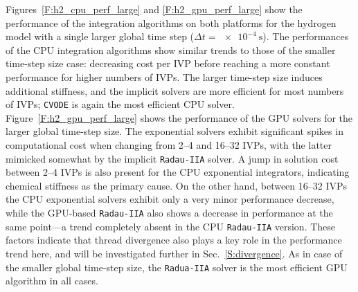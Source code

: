 \documentclass[preprint,review,11pt]{elsarticle}
\begin{document}
Figures~\ref{F:h2_cpu_perf_large} and \ref{F:h2_gpu_perf_large} show the performance of the integration algorithms on both platforms for the hydrogen model with a single larger global time step ($\Delta t=\SI{e-4}{\second}$).
The performances of the CPU integration algorithms show similar trends to those of the smaller time-step size case: decreasing cost per IVP before reaching a more constant performance for higher numbers of IVPs.
The larger time-step size induces additional stiffness, and the implicit solvers are more efficient for most numbers of IVPs; \texttt{CVODE} is again the most efficient CPU solver.
Figure~\ref{F:h2_gpu_perf_large} shows the performance of the GPU solvers for the larger global time-step size.
The exponential solvers exhibit significant spikes in computational cost when changing from 2--4 and 16--32 IVPs, with the latter mimicked somewhat by the implicit \texttt{Radau-IIA} solver.
A jump in solution cost between 2--4 IVPs is also present for the CPU exponential integrators, indicating chemical stiffness as the primary cause.
On the other hand, between 16--32 IVPs the CPU exponential solvers exhibit only a very minor performance decrease, while the GPU-based \texttt{Radau-IIA} also shows a decrease in performance at the same point---a trend completely absent in the CPU \texttt{Radau-IIA} version.
These factors indicate that thread divergence also plays a key role in the performance trend here, and will be investigated further in Sec.~\ref{S:divergence}.
As in case of the smaller global time-step size, the \texttt{Radua-IIA} solver is the most efficient GPU algorithm in all cases.
\end{document}
